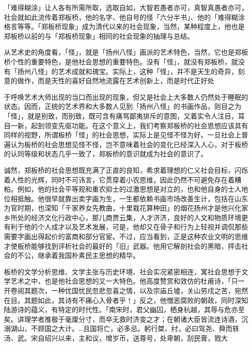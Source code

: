 「难得糊涂」让人各有所需所取，选取自如，大智若愚者亦可，真智真愚者亦可，社会就如此流传着郑板桥，他的名字、他自号的怪「六分半书」、他的「难得糊涂格言等等。「郑板桥现象」成为清代以来的社会现象，当然，某种程度上，他也是郑板桥以前的与「郑板桥现象」相同的社会现象的抽理与总结。

从艺术史的角度看，「怪」，就是「扬州八怪」画派的艺术特色，当然，它也是郑板桥个性的重要特色，是他社会思想的重要特色。没有「怪」，就没有郑板桥，就没有「扬州八怪」的艺术成就和瑰宝。实际上，这种「怪」，并不是天生的奇异，刻意的做作，而是天性的喜好自然地流露在艺术创新上，而是时代正好处

\vfill
\begin{BookNotes}
\end{BookNotes}

\noindent 于呼唤艺术大师出现的当口而出现的现象，但又是社会上大多数人仍然处于睡眠的状态。因而，正统的艺术界和大多数人见到「扬州八怪」的书画作品，则目之为「怪」，就是别致，而别致，既可含有痛骂鄙夷排斥的意图，又着实令人注目，耳目一新，起到领变先驱功能。在这个意义上，我们考察郑板桥的社会思想应该具有同样的视野，所谓板桥「怪」的社会思想，实际上是见怪不怪为好。一旦社会上普遍认为板桥的社会思想见怪不怪，岂不意味着社会的变化已经深入人心，对于板桥的认同等级和状态几乎一致了，郑板桥的意识就成为社会的意识了。

诚然，郑板桥的社会思想既充满了正直的良知，希求着理想的仁义社会目标，闪烁着人性的光辉，同时不可讳言，它贯穿着小农思维，因此仍然不可避免存在着糟粕。例如，他的社会平等观和重农抑士的过激思想是对立的，也和他自身的士人地位相抵触。他很早就靠出卖字画为生，一生都依赖书画市场改善生计，包括在山东为官时期，也深知「千家养女先教曲，十里栽花算种田」的烟花扬州才是他兴化家乡所处的经济文化行政中心，那儿商贾云集，人才济济，良好的人文和物质环境更有利于他的个人成才以及艺术发展，可是，他却又在骨子和行为上轻视并调侃那些需要字画出得起价的富商和部分官宦。不过，应当看到，正是这种农业文明的思维才使板桥能够找到评析社会的最好的「旧」武器。他用它解剖社会的黑暗，抨击社会的不公，继承着我国朴素民主思想的精华。

板桥的文学分析思维、文学主张与历史环境、社会实况紧密相连，寓社会思想于文学艺术之中，也是他社会思想的又一大特色。他高度赞赏和效仿的杜甫诗，「只一开卷阅其题次，一种忧国忧民忽悲忽喜之情，以及宗庙丘墟，关山劳戍之苦，宛然在目。其题如此，其诗有不痛心入骨者乎！」反之，他憎恶腐败的朝政，同时深知陆游诗的蕴义，有特定的时代性。「南宋时，君父幽囚，栖身杭越，其辱与危亦至矣。讲理学者推极于毫厘分寸，而卒无救时济变之才；在朝诸大臣皆流连诗酒，沉溺湖山，不顾国之大计。…且国将亡，必多忌。躬行桀、纣，必曰驾尧、舜而轶汤、武。宋自绍兴以来，主和议，增岁币，送尊号，处卑朝，刮民膏，戮大

